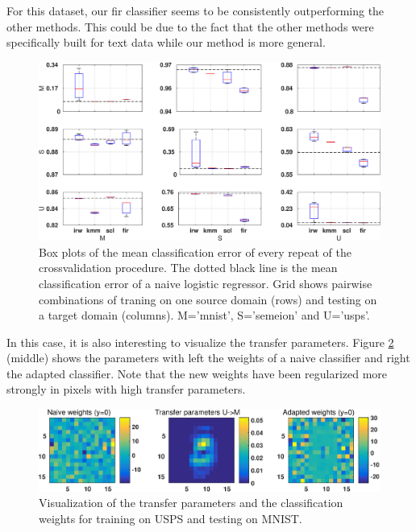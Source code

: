 \documentclass[twoside,11pt]{article}
\begin{document}
For this dataset, our fir classifier seems to be consistently outperforming the other methods. This could be due to the fact that the other methods were specifically built for text data while our method is more general.

\begin{figure}[ht]
	\centering
	\includegraphics[width=1\textwidth]{images/err_digits_box.eps}
	\caption{Box plots of the mean classification error of every repeat of the crossvalidation procedure. The dotted black line is the mean classification error of a naive logistic regressor. Grid shows pairwise combinations of traning on one source domain (rows) and testing on a target domain (columns). M='mnist', S='semeion' and U='usps'.}
	\label{err_digits}
\end{figure}

In this case, it is also interesting to visualize the transfer parameters. Figure \ref{eg_digits2} (middle) shows the parameters with left the weights of a naive classifier and right the adapted classifier. Note that the new weights have been regularized more strongly in pixels with high transfer parameters.

\begin{figure}[ht]
	\centering
	\includegraphics[width=1\textwidth]{images/tf_digits.eps}
	\caption{Visualization of the transfer parameters and the classification weights for training on USPS and testing on MNIST.}
	\label{eg_digits2}
\end{figure}
\end{document}
